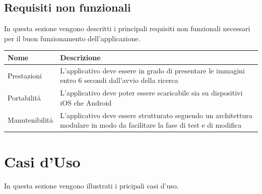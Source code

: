 \subsection{Requisiti non funzionali}
In questa sezione vengono descritti i principali requisiti non funzionali necessari per il buon funzionamento dell'applicazione.
\begin{center}
    \begin{longtable}{ | l | p{7cm} | }
        \hline
        \textbf{Nome}    & \textbf{Descrizione }                                                                                                       \\ \hline
        Prestazioni      & L'applicativo deve essere in grado di presentare le immagini entro 6 secondi dall'avvio della ricerca                       \\ \hline
        Portabilit\`a    & L'applicativo deve poter essere scaricabile sia su dispositivi iOS che Android                                              \\ \hline
        Manutenibilit\`a & L'applicativo deve essere strutturato seguendo un architettura modulare in modo da facilitare la fase di test e di modifica \\ \hline
    \end{longtable}
\end{center}

\section{Casi d'Uso}

In questa sezione vengono illustrati i pricipali casi d'uso.%
